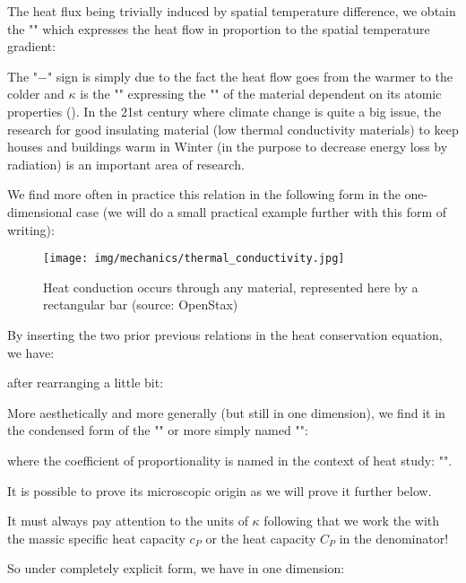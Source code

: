 	The heat flux being trivially induced by spatial temperature difference, we obtain the "" which expresses the heat flow in proportion to the spatial temperature gradient:
	
	The "$-$" sign is simply due to the fact the heat flow goes from the warmer to the colder and $\kappa$ is the "" expressing the "" of the material dependent on its atomic properties  (). In the 21st century where climate change is quite a big issue, the research for good insulating material (low thermal conductivity materials) to keep houses and buildings warm in Winter (in the purpose to decrease energy loss by radiation) is an important area of research.
	
	We find more often in practice this relation in the following form in the one-dimensional case (we will do a small practical example further with this form of writing):
	
	 \begin{figure}[H]
		\centering
		\texttt{[image: img/mechanics/thermal\_conductivity.jpg]}
		\caption[]{Heat conduction occurs through any material, represented here by a rectangular bar (source: OpenStax)}
	\end{figure}
	By inserting the two prior previous relations in the heat conservation equation, we have:
	
	after rearranging a little bit:
	
	More aesthetically and more generally (but still in one dimension), we find it in the condensed form of the "" or more simply named "":
	
	where the coefficient of proportionality is named in the context of heat study: "".
	
	
	It is possible to prove its microscopic origin as we will prove it further below.

	It must always pay attention to the units of $\kappa$ following that we work the with the massic specific heat capacity $c_P$  or the heat capacity $C_P$ in the denominator!

	So under completely explicit form, we have in one dimension:
	
